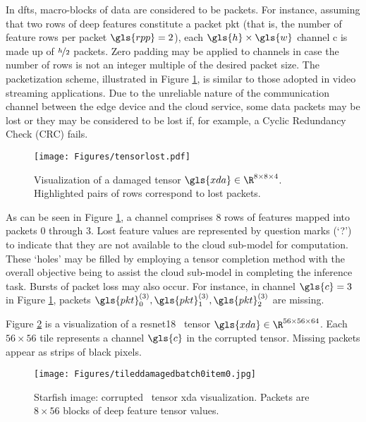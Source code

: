 In \gls{dfts}, macro-blocks of data are considered to be packets. For instance, assuming that two rows of deep features constitute a packet \gls{pkt} (that is, the number of feature rows per packet $\gls{rpp} = 2$), each $\gls{h} \times \gls{w}$ channel \gls{c} is made up of $\nicefrac{h}{2}$ packets. Zero padding may be applied to channels in case the number of rows is not an integer multiple of the desired packet size. The packetization scheme, illustrated in Figure \ref{fig:1:pkts}, is similar to those adopted in video streaming applications. Due to the unreliable nature of the communication channel between the edge device and the cloud service, some data packets may be lost or they may be considered to be lost if, for example, a Cyclic Redundancy Check (CRC) fails.


\begin{figure}[H]
	\centering
	\texttt{[image: Figures/tensorlost.pdf]}
	\caption[Visualization of a damaged tensor]{Visualization of a damaged tensor $\gls{xda} \in \R^{8 \times 8 \times 4}$. Highlighted pairs of rows correspond to lost packets.}
	\label{fig:1:pkts}
\end{figure}

As can be seen in Figure \ref{fig:1:pkts}, a channel comprises 8 rows of features mapped into packets 0 through 3. Lost feature values are represented by question marks (`?') to indicate that they are not available to the cloud sub-model for computation. These `holes' may be filled by employing a tensor completion method with the overall objective being to assist the cloud sub-model in completing the inference task. Bursts of packet loss may also occur. For instance, in channel $\gls{c} = 3$ in Figure \ref{fig:1:pkts}, packets $\gls{pkt}_0^{(3)},\gls{pkt}_1^{(3)},\gls{pkt}_2^{(3)}$ are missing.

Figure \ref{fig:intro:starfish:da} is a visualization of a \gls{resnet18} \addone~tensor $\gls{xda} \in \R^{56 \times 56 \times 64}$. Each $56 \times 56$ tile represents a channel $\gls{c}$ in the corrupted tensor. Missing packets appear as strips of black pixels.

\begin{figure}[H]
	\centering
	\texttt{[image: Figures/tileddamagedbatch0item0.jpg]}
	\caption[Starfish damaged tensor visualization]{Starfish image: corrupted \addone~tensor \gls{xda} visualization. Packets are $8 \times 56$ blocks of deep feature tensor values.}
	\label{fig:intro:starfish:da}
\end{figure}

